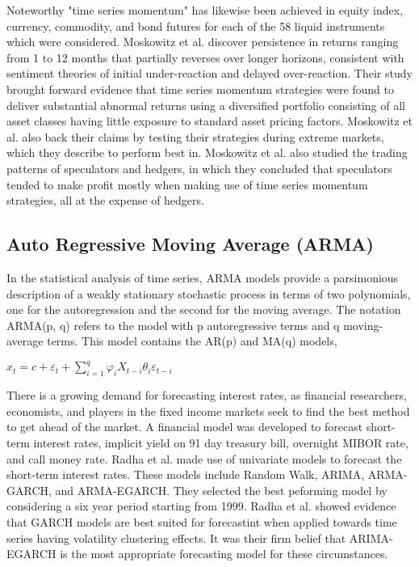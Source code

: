 Noteworthy "time series momentum" has likewise been achieved in equity index, currency, commodity, and bond futures for each of the 58 liquid instruments which were considered.\cite{Moskowitz:2011aa} Moskowitz et al. discover persistence in returns ranging from 1 to 12 months that partially reverses over longer horizons, consistent with sentiment theories of initial under-reaction and delayed over-reaction. Their study brought forward evidence that time series momentum strategies were found to deliver substantial abnormal returns using a diversified portfolio consisting of all asset classes having little exposure to standard asset pricing factors. Moskowitz et al. also back their claims by testing their strategies during extreme markets, which they describe to perform best in. Moskowitz et al. also studied the trading patterns of speculators and hedgers, in which they concluded that speculators tended to make profit mostly when making use of time series momentum strategies, all at the expense of hedgers.

\subsection{Auto Regressive Moving Average (ARMA)}

In the statistical analysis of time series, ARMA models provide a parsimonious description of a weakly stationary stochastic process in terms of two polynomials, one for the autoregression and the second for the moving average. The notation ARMA(p, q) refers to the model with p autoregressive terms and q moving-average terms. This model contains the AR(p) and MA(q) models,

\(x_t = c+\varepsilon_t+\sum^{q}_{i=1} \varphi_iX_{t-i}\theta_i\varepsilon_{t-i}\)

There is a growing demand for forecasting interest rates, as financial researchers, economists, and players in the fixed income markets seek to find the best method to get ahead of the market. A financial model was developed to forecast short-term interest rates, implicit yield on 91 day treasury bill, overnight MIBOR rate, and call money rate.\cite{Radha:2015aa} Radha et al. made use of univariate models to forecast the short-term interest rates. These models include Random Walk, ARIMA, ARMA-GARCH, and ARMA-EGARCH. They selected the best peforming model by considering a six year period starting from 1999. Radha et al. showed evidence that GARCH models are best suited for forecastint when applied towards time series having volatility clustering effects. It was their firm belief that ARIMA-EGARCH is the most appropriate forecasting model for these circumstances.

